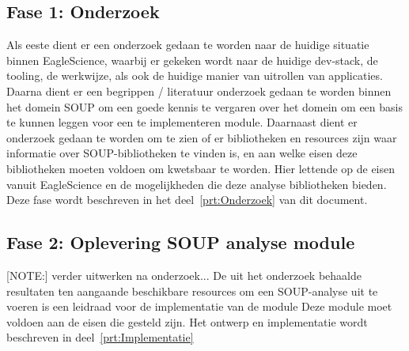 \subsection{Fase 1: Onderzoek} \label{subsec:fase-1:-onderzoek}
Als eeste dient er een onderzoek gedaan te worden naar de huidige situatie binnen EagleScience, waarbij er gekeken wordt naar de huidige dev-stack, de tooling, de werkwijze, als ook de huidige manier van uitrollen van applicaties. Daarna dient er een begrippen / literatuur onderzoek gedaan te worden binnen het domein SOUP om een goede kennis te vergaren over het domein om een basis te kunnen leggen voor een te implementeren module. Daarnaast dient er onderzoek gedaan te worden om te zien of er bibliotheken en resources zijn waar informatie over SOUP-bibliotheken te vinden is, en aan welke eisen deze bibliotheken moeten voldoen om kwetsbaar te worden. Hier lettende op de eisen vanuit EagleScience en de mogelijkheden die deze analyse bibliotheken bieden. Deze fase wordt beschreven in het deel~\ref{prt:Onderzoek} van dit document.

\subsection{Fase 2: Oplevering SOUP analyse module}\label{subsec:fase-2:-oplevering-soup-analyse-module}
[NOTE:] verder uitwerken na onderzoek...
De uit het onderzoek behaalde resultaten ten aangaande beschikbare resources om een SOUP-analyse uit te voeren is een leidraad voor de implementatie van de module Deze module moet voldoen aan de eisen die gesteld zijn. Het ontwerp en implementatie wordt beschreven in deel~\ref{prt:Implementatie}
